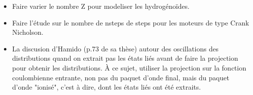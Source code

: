 \documentclass{article}
\begin{document}
\begin{itemize}
      son actuelle implementation.
\item Faire varier le nombre Z pour modeliser les hydrog\'eno\"ides.
\item Faire l'\'etude sur le nombre de nsteps de steps pour les moteurs 
      de type Crank Nicholson.
\item La discusion d'Hamido (p.73 de sa th\`ese) autour des 
      oscillations des distributions 
      quand on extrait pas les \'etats li\'es avant de faire la 
      projection pour obtenir les distributions. \`A ce sujet, 
      utiliser la projection sur la fonction coulombienne entrante, 
      non pas du paquet d'onde final, mais du paquet d'onde "ionis\'e", 
      c'est \`a dire, dont les \'etats li\'es ont \'et\'e extraits.   
\end{itemize}
\end{document}
